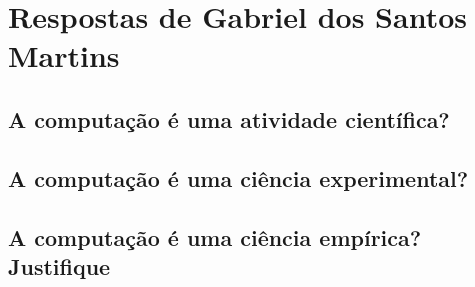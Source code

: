 \section{Respostas de Gabriel dos Santos Martins}

\subsection{A computação é uma atividade científica?}


\subsection{A computação é uma ciência experimental?}

\subsection{A computação é uma ciência empírica? Justifique}
